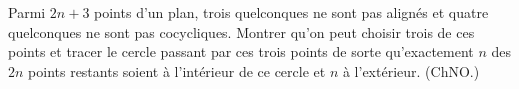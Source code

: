 Parmi $2n + 3$ points d'un plan, trois quelconques ne sont pas alignés et quatre quelconques ne sont pas cocycliques. Montrer qu'on peut choisir trois de ces points et tracer le cercle passant par ces trois points de sorte qu'exactement $n$ des $2n$ points restants soient à l'intérieur de ce cercle et $n$ à l'extérieur. (ChNO.)

